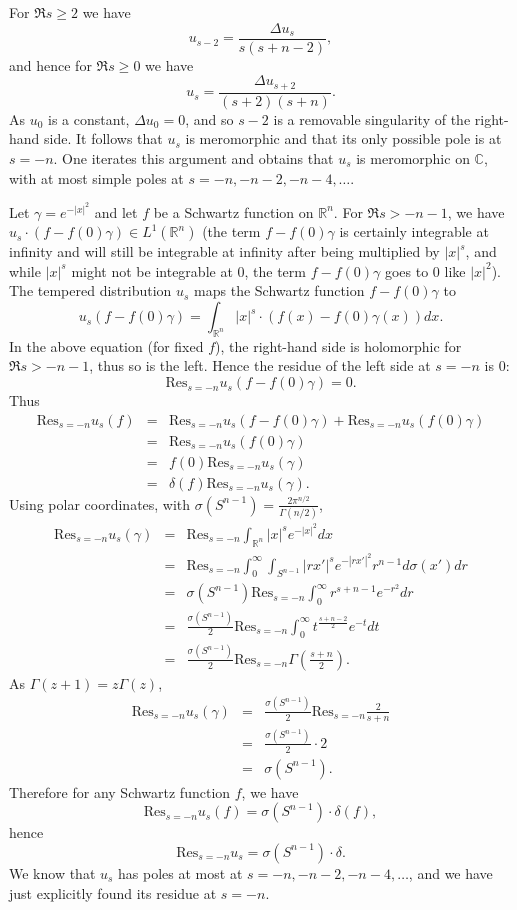 \documentclass{article}
\newcommand{\Res}{\textrm{Res}}
\begin{document}
For $\Re s \geq 2$ we have 
\[
u_{s-2} = \frac{\Delta u_s}{s(s+n-2)},
\]
and hence for $\Re s \geq 0$ we have
\[
u_s = \frac{\Delta u_{s+2}}{(s+2)(s+n)}.
\]
As $u_0$ is a constant, $\Delta u_0=0$, and so $s-2$ is a removable singularity of the right-hand side. It follows that $u_s$ is meromorphic and that its only
possible pole is at $s=-n$. One iterates this argument and obtains that $u_s$ is meromorphic on $\mathbb{C}$, with at most simple poles at $s=-n,-n-2,-n-4,\ldots$. 
 
Let $\gamma=e^{-|x|^2}$ and let $f$ be a Schwartz function on $\mathbb{R}^n$. For $\Re s > -n-1$, we have $u_s \cdot (f-f(0)\gamma) \in L^1(\mathbb{R}^n)$ (the term
$f-f(0)\gamma$ is certainly integrable at infinity and will still be integrable at infinity after being multiplied by $|x|^s$, and while $|x|^s$ might not be
integrable at $0$, the term $f-f(0)\gamma$ goes to $0$ like $|x|^2$). The tempered distribution
$u_s$ maps the Schwartz function $f-f(0)\gamma$ to
\[
u_s(f-f(0)\gamma)=\int_{\mathbb{R}^n} |x|^s \cdot (f(x)-f(0)\gamma(x)) dx.
\]
In the above equation (for fixed $f$), the right-hand side is holomorphic for $\Re s>-n-1$, thus so is the left. Hence the residue of the left side at $s=-n$ is $0$: 
\[
\Res_{s=-n} u_s(f-f(0)\gamma)=0.
\]
Thus
\begin{eqnarray*}
\Res_{s=-n} u_s(f)&=&\Res_{s=-n} u_s(f-f(0)\gamma)+\Res_{s=-n} u_s(f(0)\gamma)\\
&=&\Res_{s=-n} u_s(f(0)\gamma)\\
&=&f(0)\Res_{s=-n} u_s(\gamma)\\
&=&\delta(f) \Res_{s=-n} u_s(\gamma).
\end{eqnarray*}
Using polar coordinates, with $\sigma(S^{n-1})=\frac{2\pi^{n/2}}{\Gamma(n/2)}$,
\begin{eqnarray*}
\Res_{s=-n} u_s(\gamma)&=&\Res_{s=-n} \int_{\mathbb{R}^n} |x|^s e^{-|x|^2} dx\\
&=&\Res_{s=-n} \int_0^\infty \int_{S^{n-1}} |rx'|^s e^{-|rx'|^2} r^{n-1} d\sigma(x') dr\\
&=&\sigma(S^{n-1}) \Res_{s=-n} \int_0^\infty r^{s+n-1} e^{-r^2} dr\\
&=&\frac{\sigma(S^{n-1})}{2} \Res_{s=-n} \int_0^\infty t^{\frac{s+n-2}{2}} e^{-t} dt\\
&=&\frac{\sigma(S^{n-1})}{2} \Res_{s=-n} \Gamma(\frac{s+n}{2}).
\end{eqnarray*}
As $\Gamma(z+1)=z\Gamma(z)$,
\begin{eqnarray*}
\Res_{s=-n} u_s(\gamma) &=& \frac{\sigma(S^{n-1})}{2} \Res_{s=-n} \frac{2}{s+n}\\
&=&\frac{\sigma(S^{n-1})}{2} \cdot 2\\
&=&\sigma(S^{n-1}).
\end{eqnarray*}
Therefore for any Schwartz function $f$, we have 
\[
\Res_{s=-n} u_s(f)=\sigma(S^{n-1}) \cdot \delta(f),
\]
hence
\[
\Res_{s=-n} u_s=\sigma(S^{n-1}) \cdot \delta.
\]
We know that $u_s$ has poles at most at $s=-n,-n-2,-n-4,\ldots$, and we have just explicitly found its residue at $s=-n$. 
\end{document}
